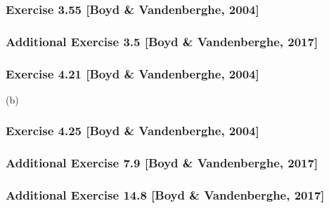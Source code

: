 \documentclass[12pt,a4paper]{article}
\begin{document}
\subsubsection*{Exercise 3.55 [Boyd \& Vandenberghe, 2004]}
\newpage\subsubsection*{Additional Exercise 3.5 [Boyd \& Vandenberghe, 2017]}
\newpage\subsubsection*{Exercise 4.21 [Boyd \& Vandenberghe, 2004]}
(b)
\newpage\subsubsection*{Exercise 4.25 [Boyd \& Vandenberghe, 2004]}
\newpage\subsubsection*{Additional Exercise 7.9 [Boyd \& Vandenberghe, 2017]}
\newpage\subsubsection*{Additional Exercise 14.8 [Boyd \& Vandenberghe, 2017]}
\end{document}
